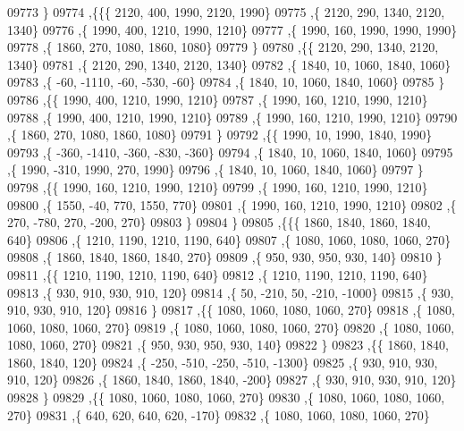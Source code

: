 \begin{DoxyCode}
09773    \}
09774   ,\{\{\{  2120,   400,  1990,  2120,  1990\}
09775     ,\{  2120,   290,  1340,  2120,  1340\}
09776     ,\{  1990,   400,  1210,  1990,  1210\}
09777     ,\{  1990,   160,  1990,  1990,  1990\}
09778     ,\{  1860,   270,  1080,  1860,  1080\}
09779     \}
09780    ,\{\{  2120,   290,  1340,  2120,  1340\}
09781     ,\{  2120,   290,  1340,  2120,  1340\}
09782     ,\{  1840,    10,  1060,  1840,  1060\}
09783     ,\{   -60, -1110,   -60,  -530,   -60\}
09784     ,\{  1840,    10,  1060,  1840,  1060\}
09785     \}
09786    ,\{\{  1990,   400,  1210,  1990,  1210\}
09787     ,\{  1990,   160,  1210,  1990,  1210\}
09788     ,\{  1990,   400,  1210,  1990,  1210\}
09789     ,\{  1990,   160,  1210,  1990,  1210\}
09790     ,\{  1860,   270,  1080,  1860,  1080\}
09791     \}
09792    ,\{\{  1990,    10,  1990,  1840,  1990\}
09793     ,\{  -360, -1410,  -360,  -830,  -360\}
09794     ,\{  1840,    10,  1060,  1840,  1060\}
09795     ,\{  1990,  -310,  1990,   270,  1990\}
09796     ,\{  1840,    10,  1060,  1840,  1060\}
09797     \}
09798    ,\{\{  1990,   160,  1210,  1990,  1210\}
09799     ,\{  1990,   160,  1210,  1990,  1210\}
09800     ,\{  1550,   -40,   770,  1550,   770\}
09801     ,\{  1990,   160,  1210,  1990,  1210\}
09802     ,\{   270,  -780,   270,  -200,   270\}
09803     \}
09804    \}
09805   ,\{\{\{  1860,  1840,  1860,  1840,   640\}
09806     ,\{  1210,  1190,  1210,  1190,   640\}
09807     ,\{  1080,  1060,  1080,  1060,   270\}
09808     ,\{  1860,  1840,  1860,  1840,   270\}
09809     ,\{   950,   930,   950,   930,   140\}
09810     \}
09811    ,\{\{  1210,  1190,  1210,  1190,   640\}
09812     ,\{  1210,  1190,  1210,  1190,   640\}
09813     ,\{   930,   910,   930,   910,   120\}
09814     ,\{    50,  -210,    50,  -210, -1000\}
09815     ,\{   930,   910,   930,   910,   120\}
09816     \}
09817    ,\{\{  1080,  1060,  1080,  1060,   270\}
09818     ,\{  1080,  1060,  1080,  1060,   270\}
09819     ,\{  1080,  1060,  1080,  1060,   270\}
09820     ,\{  1080,  1060,  1080,  1060,   270\}
09821     ,\{   950,   930,   950,   930,   140\}
09822     \}
09823    ,\{\{  1860,  1840,  1860,  1840,   120\}
09824     ,\{  -250,  -510,  -250,  -510, -1300\}
09825     ,\{   930,   910,   930,   910,   120\}
09826     ,\{  1860,  1840,  1860,  1840,  -200\}
09827     ,\{   930,   910,   930,   910,   120\}
09828     \}
09829    ,\{\{  1080,  1060,  1080,  1060,   270\}
09830     ,\{  1080,  1060,  1080,  1060,   270\}
09831     ,\{   640,   620,   640,   620,  -170\}
09832     ,\{  1080,  1060,  1080,  1060,   270\}

\end{DoxyCode}
